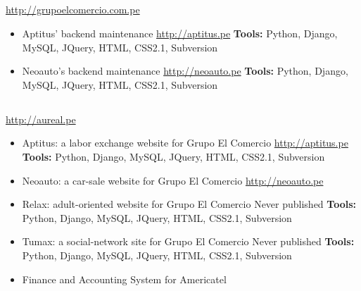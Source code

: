 \documentclass[11pt,a4paper,english]{moderncv}
\begin{document}
\subsection{}

{
\url{http://grupoelcomercio.com.pe}
\newline{}
\begin{itemize}
    \item Aptitus' backend maintenance
        \newline{}
        \url{http://aptitus.pe}
        \newline{}
        \textbf{Tools:} Python, Django, MySQL, JQuery, HTML, CSS2.1, Subversion
    \item Neoauto's backend maintenance
        \newline{}
        \url{http://neoauto.pe}
        \newline{}
        \textbf{Tools:} Python, Django, MySQL, JQuery, HTML, CSS2.1, Subversion
\end{itemize}
}

\subsection{}

{
\url{http://aureal.pe}
\newline{}
\begin{itemize}
    \item Aptitus: a labor exchange website for Grupo El Comercio
        \newline{}
        \url{http://aptitus.pe}
        \newline{}
        \textbf{Tools:} Python, Django, MySQL, JQuery, HTML, CSS2.1, Subversion
    \item Neoauto: a car-sale website for Grupo El Comercio
        \newline{}
        \url{http://neoauto.pe}
    \item Relax: adult-oriented website for Grupo El Comercio
        \newline{}
        Never published
        \newline{}
        \textbf{Tools:} Python, Django, MySQL, JQuery, HTML, CSS2.1, Subversion
    \item Tumax: a social-network site for Grupo El Comercio
        \newline{}
        Never published
        \newline{}
        \textbf{Tools:} Python, Django, MySQL, JQuery, HTML, CSS2.1, Subversion
    \item Finance and Accounting System for Americatel
\end{itemize}
}
\end{document}
